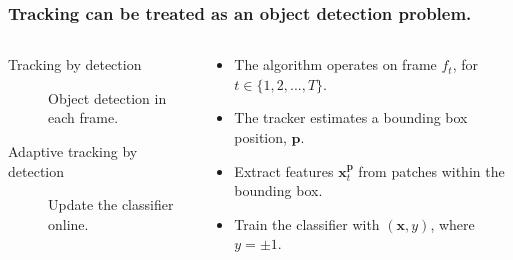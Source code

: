 \begin{frame}
    \frametitle{Tracking can be treated as an object detection problem.}
    \begin{columns}[T]
        \begin{column}{0.5\textwidth}
            \begin{description}
                \item [Tracking by detection] Object detection in each frame.
                \item [Adaptive tracking by detection] Update the classifier online.
            \end{description}
        \end{column}
        \begin{column}{0.5\textwidth}
            \begin{itemize}
                \item The algorithm operates on frame \(f_t\), for \(t \in \{1, 2, ..., T\}\).
                \item The tracker estimates a bounding box position, \(\mathbf{p}\).
                \item Extract features \(\mathbf{x}_t^\mathbf{p}\) from patches within the bounding box.
                \item Train the classifier with \((\mathbf{x}, y)\), where \(y = \pm1\).
            \end{itemize}
        \end{column}
    \end{columns}
\end{frame}
